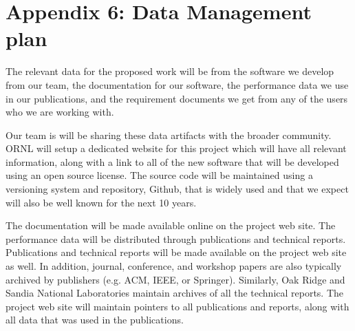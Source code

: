 \section*{Appendix 6: Data Management plan}

\vspace{1ex}
\noindent
The relevant data for the proposed work will be from the software we develop from our team, the documentation for our software, the performance data we use in our publications,
and the requirement documents we get from any of the users who we are working with.


Our team is  will be sharing these data artifacts with the broader community. ORNL will setup a dedicated website for this project which will have all relevant information, along with
a link to all of the new software that will be developed using an open source license.  The source code will be maintained using a versioning system and repository, Github, that is widely used and that we expect will also be well known for the next 10 years. 

The documentation will be made available online on the project web site. The performance data will be distributed through publications and technical reports. Publications and technical reports will be made available on the project web site as well. In addition, journal, conference, and workshop papers are also typically archived by publishers (e.g. ACM, IEEE, or Springer). Similarly, Oak Ridge and Sandia National Laboratories maintain archives of all the technical reports. The project web site will maintain pointers to all publications and reports, along with all data that was used in the publications.
